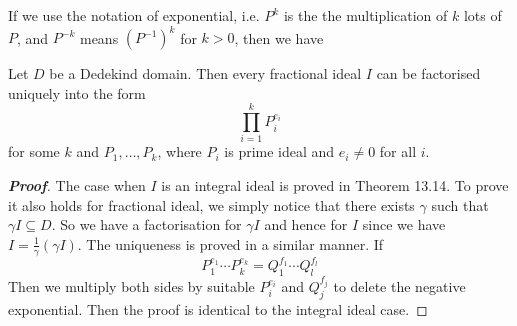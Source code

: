 If we use the notation of exponential, i.e. $P^k$ is the the multiplication of $k$ lots of $P$, and
$P^{-k}$ means $(P^{-1})^k$ for $k >0$, then we have
\begin{theorem} Let $D$ be a Dedekind domain. Then every fractional ideal $I$ can be factorised uniquely into the form
$$\prod_{i=1}^k P_i^{e_i}$$
for some $k$ and $P_1,\ldots,P_k$, where $P_i$ is prime ideal and $e_i \neq 0$ for all $i$.
\end{theorem}
\begin{proof}[\bf Proof] The case when $I$ is an integral ideal is proved in Theorem 13.14. To prove it also holds for fractional ideal, we simply notice that there exists $\gamma$ such that $\gamma I \subseteq D$. So we have a
factorisation for $\gamma I$ and hence for $I$ since we have $I=\frac{1}{\gamma}(\gamma I)$.
The uniqueness is proved in a similar manner. If
$$P_1^{e_1} \cdots P_k^{e_k}=Q_1^{f_1} \cdots Q_l^{f_l}$$
Then we multiply both sides by suitable $P_i^{e_i}$ and $Q_j^{f_j}$ to delete the negative exponential. Then the proof is identical to the integral ideal case.
\end{proof}
